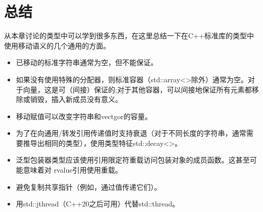 \section{总结}
从本章讨论的类型中可以学到很多东西，在这里总结一下在C++标准库的类型中使用移动语义的几个通用的方面。

\begin{itemize}
	\item 已移动的标准字符串通常为空，但不能保证。
	\item 如果没有使用特殊的分配器，则标准容器（std::array<>除外）通常为空。对于向量，这是可（间接）保证的;对于其他容器，可以间接地保证所有元素都移除或销毁，插入新成员没有意义。
	\item 移动赋值可以改变字符串和vectgor的容量。
	\item 为了在向通用/转发引用传递值时支持衰退（对于不同长度的字符串，通常需要推导出相同的类型），使用类型特征std::decay<>。
	\item 泛型包装器类型应该使用引用限定符重载访问包装对象的成员函数。这甚至可能意味着对 rvalue引用使用重载。
	\item 避免复制共享指针（例如，通过值传递它们）。
	\item 用std::jthread（C++20之后可用）代替std::thread。
\end{itemize}



